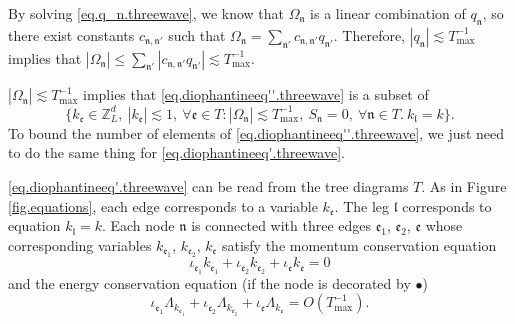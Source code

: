 By solving \eqref{eq.q_n.threewave}, we know that $\Omega_{\mathfrak{n}}$ is a linear combination of $q_{\mathfrak{n}}$, so there exist constants $c_{\mathfrak{n},\mathfrak{n}'}$ such that $\Omega_{\mathfrak{n}}=\sum_{\mathfrak{n}'}c_{\mathfrak{n},\mathfrak{n}'}q_{\mathfrak{n}'}$. Therefore, $|q_{\mathfrak{n}}|\lesssim T^{-1}_{\text{max}}$ implies that $|\Omega_{\mathfrak{n}}|\le\sum_{\mathfrak{n}'}|c_{\mathfrak{n},\mathfrak{n}'}q_{\mathfrak{n}'}|\lesssim T^{-1}_{\text{max}}$.

$|\Omega_{\mathfrak{n}}|\lesssim T^{-1}_{\text{max}}$ implies that \eqref{eq.diophantineeq''.threewave} is a subset of
\begin{equation}\label{eq.diophantineeq'.threewave}
    \{k_{\mathfrak{e}}\in \mathbb{Z}^d_L,\ |k_{\mathfrak{e}}|\lesssim 1,\ \forall \mathfrak{e}\in T: |\Omega_{\mathfrak{n}}|\lesssim T^{-1}_{\text{max}},\ S_{\mathfrak{n}}=0,\ \forall \mathfrak{n}\in T. \ k_{\mathfrak{l}}=k\}.
\end{equation}
To bound the number of elements of \eqref{eq.diophantineeq''.threewave}, we just need to do the same thing for \eqref{eq.diophantineeq'.threewave}.

\eqref{eq.diophantineeq'.threewave} can be read from the tree diagrams $T$. As in Figure \ref{fig.equations}, each edge corresponds to a variable $k_{\mathfrak{e}}$. The leg $\mathfrak{l}$ corresponds to equation $k_{\mathfrak{l}}=k$. Each node $\mathfrak{n}$ is connected with three edges $\mathfrak{e}_1$, $\mathfrak{e}_2$, $\mathfrak{e}$ whose corresponding variables $k_{\mathfrak{e}_1}$, $k_{\mathfrak{e}_2}$, $k_{\mathfrak{e}}$ satisfy the momentum conservation equation
\begin{equation}
\iota_{\mathfrak{e}_1}k_{\mathfrak{e}_1}+\iota_{\mathfrak{e}_2}k_{\mathfrak{e}_2}+\iota_{\mathfrak{e}}k_{\mathfrak{e}}=0
\end{equation}
and the energy conservation equation (if the node is decorated by $\bullet$)
\begin{equation}
    \iota_{\mathfrak{e}_1}\Lambda_{k_{\mathfrak{e}_1}}+\iota_{\mathfrak{e}_2}\Lambda_{k_{\mathfrak{e}_2}}+\iota_{\mathfrak{e}}\Lambda_{k_{\mathfrak{e}}} = O(T^{-1}_{\text{max}}).
\end{equation}



